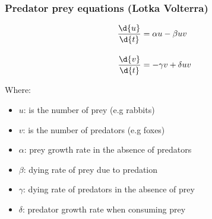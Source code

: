 \documentclass[xcolor=table]{beamer}
\begin{document}
\begin{frame}[fragile]
\frametitle{Predator prey equations (Lotka Volterra)}


\begin{align*}
 \frac{\d{u}}{\d{t}} &= \alpha u - \beta uv\\[1em]
\frac{\d{v}}{\d{t}} &= -\gamma v + \delta uv 
\end{align*}





Where:

\begin{itemize}
\item $u$: is the number of prey (e.g rabbits)
\item $v$: is the number of predators (e.g foxes)
\item $\alpha$: prey growth rate in the absence of predators
\item $\beta$: dying rate of prey due to predation
\item $\gamma$: dying rate of predators in the absence of prey
\item $\delta$: predator growth rate when consuming prey
\end{itemize}


\end{frame}
\end{document}
